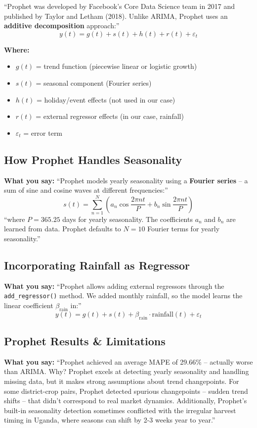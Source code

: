 \documentclass[11pt,a4paper]{article}
\begin{document}
``Prophet was developed by Facebook's Core Data Science team in 2017 and published by Taylor and Letham (2018). Unlike ARIMA, Prophet uses an \textbf{additive decomposition} approach:''
$$y(t) = g(t) + s(t) + h(t) + r(t) + \varepsilon_t$$

\textbf{Where:}
\begin{itemize}
    \item $g(t)$ = trend function (piecewise linear or logistic growth)
    \item $s(t)$ = seasonal component (Fourier series)
    \item $h(t)$ = holiday/event effects (not used in our case)
    \item $r(t)$ = external regressor effects (in our case, rainfall)
    \item $\varepsilon_t$ = error term
\end{itemize}

\subsection{How Prophet Handles Seasonality}
\textbf{What you say:}
``Prophet models yearly seasonality using a \textbf{Fourier series} -- a sum of sine and cosine waves at different frequencies:''
$$s(t) = \sum_{n=1}^{N} \left(a_n \cos\frac{2\pi n t}{P} + b_n \sin\frac{2\pi n t}{P}\right)$$
``where $P = 365.25$ days for yearly seasonality. The coefficients $a_n$ and $b_n$ are learned from data. Prophet defaults to $N = 10$ Fourier terms for yearly seasonality.''

\subsection{Incorporating Rainfall as Regressor}
\textbf{What you say:}
``Prophet allows adding external regressors through the \texttt{add\_regressor()} method. We added monthly rainfall, so the model learns the linear coefficient $\beta_{\text{rain}}$ in:''
$$y(t) = g(t) + s(t) + \beta_{\text{rain}} \cdot \text{rainfall}(t) + \varepsilon_t$$

\subsection{Prophet Results \& Limitations}
\textbf{What you say:}
``Prophet achieved an average MAPE of 29.66\% -- actually worse than ARIMA. Why? Prophet excels at detecting yearly seasonality and handling missing data, but it makes strong assumptions about trend changepoints. For some district-crop pairs, Prophet detected spurious changepoints -- sudden trend shifts -- that didn't correspond to real market dynamics. Additionally, Prophet's built-in seasonality detection sometimes conflicted with the irregular harvest timing in Uganda, where seasons can shift by 2-3 weeks year to year.''
\end{document}
